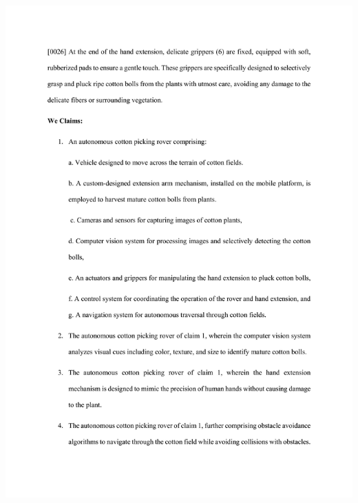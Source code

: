 \documentclass[12pt,a4paper]{report}
\begin{document}
\includegraphics[scale =0.7]{images/patent/patent_doc/output-0006.jpg}
\newpage
\end{document}
